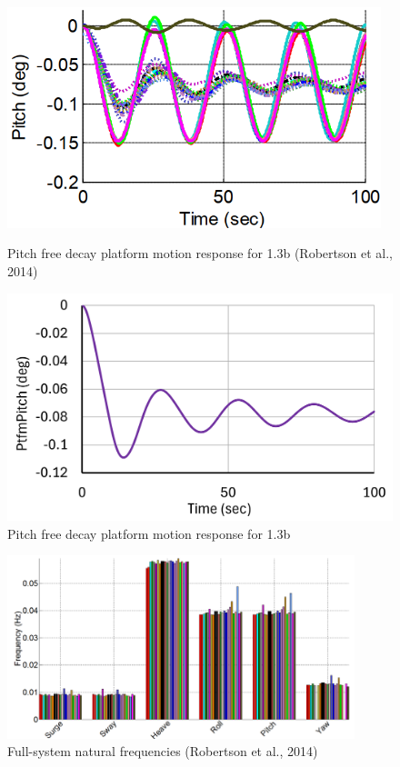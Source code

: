 \documentclass[a4paper]{article}
\begin{document}
\begin{figure}[H]
    \begin{minipage}{0.47\textwidth}
        \centering
        \includegraphics[width=0.97\textwidth]{1.3b_pitch.png}
        \caption{\small Pitch free decay platform motion response for 1.3b (Robertson et al., 2014)}
        \label{fig:1.3b_pitch}
    \end{minipage}
    \hfill
    \begin{minipage}{0.5\textwidth}
        \centering
        \vspace{-0.3cm}
        \includegraphics[width=1\textwidth]{1.3b_pitch_mine.png}
        \caption{\small Pitch free decay platform motion response for 1.3b}
        \label{fig:1.3b_pitch_mine}
    \end{minipage}
\end{figure}


\begin{figure}[H]
    \centering
    \includegraphics[width=0.9\textwidth]{nat_freq.png}
    \caption{\small Full-system natural frequencies (Robertson et al., 2014)}
    \label{fig:nat_freq}
\end{figure}
\end{document}
